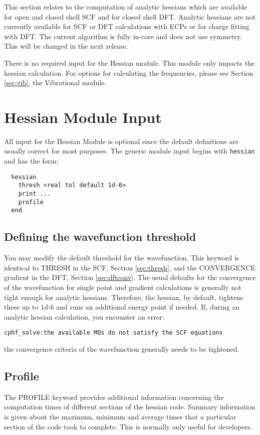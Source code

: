 \label{sec:hess}

This section relates to the computation of analytic hessians which
are available for open and closed shell SCF and for closed shell
DFT.  Analytic hessians are not currently available for SCF or DFT
calculations with ECPs or for charge fitting with DFT.  The current
algorithm is fully in-core and does not use symmetry.  This will be
changed in the next release.

There is no required input for the Hessian module.  This module only
impacts the hessian calculation.  For options for calculating the
frequencies, please see Section \ref{sec:vib}, the Vibrational module.

\section{Hessian Module Input}

All input for the Hessian Module is optional since the default
definitions are usually correct for most purposes.  
The generic module input begins with \verb+hessian+
and has the form:
\begin{verbatim}
  hessian
    thresh <real tol default 1d-6>
    print ...
    profile
  end
\end{verbatim}

\subsection{Defining the wavefunction threshold}
You may modify the default threshold for the wavefunction.  This keyword
is identical to THRESH in the SCF, Section \ref{sec:thresh}, and the
CONVERGENCE gradient in the DFT, Section \ref{sec:dftconv}.  The usual
defaults for the convergence of the wavefunction for single point and
gradient calculations is generally not tight enough for analytic hessians.
Therefore, the hessian, by default, tightens these up to 1d-6 and runs
an additional energy point if needed.  If,
during an analytic hessian calculation, you encounter an error:
\begin{verbatim}
cphf_solve:the available MOs do not satisfy the SCF equations
\end{verbatim}
the convergence criteria of the wavefunction generally needs to be
tightened.

\subsection{Profile}
The PROFILE keyword provides additional information concerning the 
computation times of
different sections of the hessian code.  Summary information is
given about the maximum, minimum and average times that a particular
section of the code took to complete.  This is normally only useful
for developers.

